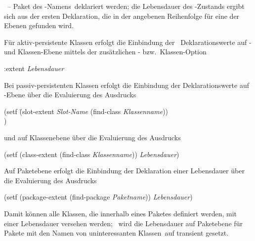 \rglq\cls\rgrq\ -- \rglq{}Paket des
\cls[n]-Namens\rgrq\  deklariert werden; die Lebensdauer
des \Slt\/-Zustands ergibt sich aus der ersten Deklaration, die
in der angebenen Reihenfolge f\"{u}r eine der Ebenen gefunden wird.
%
\par{}F\"{u}r aktiv-persistente Klassen erfolgt die Einbindung der
\og[en]\ Deklarationswerte auf \Slt\/- und Klassen-Ebene mittels der
zu\-s\"{a}tz\-li\-chen \Slt\/- bzw.\ Klassen-Option
%
\begin{listing}[\tt]%
:extent {\rm\it\lt{}Lebensdauer\gt\/}
\end{listing}%
%
\par{}Bei passiv-persistenten Klassen erfolgt die
Einbindung der Deklarationswerte auf \Slt\/-Ebene \"{u}ber die
Evaluierung des Ausdrucks
%
\begin{listing}[\tt]%
(setf \=(slot-extent {\rm\it\lt{}Slot-Name\gt\/}
                     (find-class {\rm\it\lt{}Klassenname\gt\/}))\\
      )
\end{listing}%
%
\noindent und auf Klassenebene \"{u}ber die Evaluierung des Ausdrucks
%
\begin{listing}[\tt]%
(setf (class-extent (find-class {\rm\it\lt{}Klassenname\gt\/}))
      {\rm\it\lt{}Lebensdauer\gt\/})
\end{listing}%
%
\par{}Auf Paketebene erfolgt die Einbindung der Deklaration einer
Lebensdauer \"{u}ber die Evaluierung des Ausdrucks
%
\begin{listing}[\tt]%
(setf (package-extent (find-package {\rm\it\lt{}Paketname\gt\/}))
      {\rm\it\lt{}Lebensdauer\gt\/})
\end{listing}%
%
\noindent Damit k\"{o}nnen alle Klassen, die innerhalb
eines Paketes definiert werden, mit einer Lebensdauer versehen werden;
\ia\ wird die Lebensdauer auf Paketebene f\"{u}r Pakete mit
den Namen von \rglq{}uninteressanten Klassen\rgrq\ auf transient
gesetzt.
%
%
%
%
%
